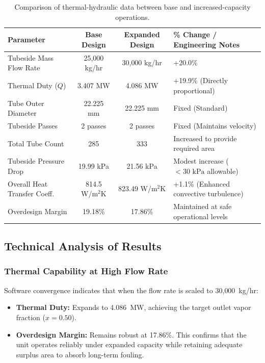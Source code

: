 \documentclass[12pt]{article}
\begin{document}
\begin{table}[H]
\centering
\small
\begin{tabular}{lccl}
\toprule
\textbf{Parameter} & \textbf{Base Design} & \textbf{Expanded Design} & \textbf{\% Change / Engineering Notes} \\
\midrule
Tubeside Mass Flow Rate & 25{,}000 kg/hr & 30{,}000 kg/hr & +20.0\% \\
Thermal Duty ($Q$) & 3.407 MW & 4.086 MW & +19.9\% (Directly proportional) \\
Tube Outer Diameter & 22.225 mm & 22.225 mm & Fixed (Standard) \\
Tubeside Passes & 2 passes & 2 passes & Fixed (Maintains velocity) \\
Total Tube Count & 285 & 333 & Increased to provide required area \\
Tubeside Pressure Drop & 19.99 kPa & 21.56 kPa & Modest increase ($< 30\text{ kPa}$ allowable) \\
Overall Heat Transfer Coeff. & 814.5 W/m$^2$K & 823.49 W/m$^2$K & +1.1\% (Enhanced convective turbulence) \\
Overdesign Margin & 19.18\% & 17.86\% & Maintained at safe operational levels \\
\bottomrule
\end{tabular}
\caption{Comparison of thermal-hydraulic data between base and increased-capacity operations.}
\label{tab:expansion_comparison}
\end{table}

\subsection{Technical Analysis of Results}

\subsubsection{Thermal Capability at High Flow Rate}

Software convergence indicates that when the flow rate is scaled to 30{,}000~kg/hr:
\begin{itemize}
\item \textbf{Thermal Duty:} Expands to 4.086~MW, achieving the target outlet vapor fraction ($x = 0.50$).
\item \textbf{Overdesign Margin:} Remains robust at 17.86\%. This confirms that the unit operates reliably under expanded capacity while retaining adequate surplus area to absorb long-term fouling.
\end{itemize}
\end{document}
